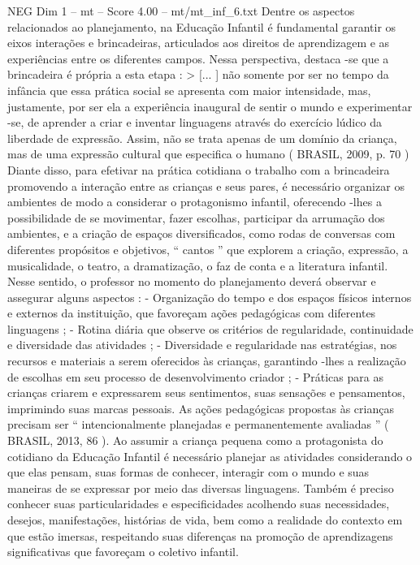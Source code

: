 \begin{textsample}{NEG Dim 1 – mt – Score 4.00 – mt/mt\_inf\_6.txt}
Dentre os aspectos relacionados ao planejamento, na Educação Infantil é fundamental garantir os eixos interações e brincadeiras, articulados aos direitos de aprendizagem e as experiências entre os diferentes campos.
Nessa perspectiva, destaca -se que a brincadeira é própria a esta etapa : > [... ] não somente por ser no tempo da infância que essa prática social se apresenta com maior intensidade, mas, justamente, por ser ela a experiência inaugural de sentir o mundo e experimentar -se, de aprender a criar e inventar linguagens através do exercício lúdico da liberdade de expressão.
Assim, não se trata apenas de um domínio da criança, mas de uma expressão cultural que especifica o humano ( BRASIL, 2009, p. 70 ) Diante disso, para efetivar na prática cotidiana o trabalho com a brincadeira promovendo a interação entre as crianças e seus pares, é necessário organizar os ambientes de modo a considerar o protagonismo infantil, oferecendo -lhes a possibilidade de se movimentar, fazer escolhas, participar da arrumação dos ambientes, e a criação de espaços diversificados, como rodas de conversas com diferentes propósitos e objetivos, “ cantos ” que explorem a criação, expressão, a musicalidade, o teatro, a dramatização, o faz de conta e a literatura infantil.
Nesse sentido, o professor no momento do planejamento deverá observar e assegurar alguns aspectos : - Organização do tempo e dos espaços físicos internos e externos da instituição, que favoreçam ações pedagógicas com diferentes linguagens ; - Rotina diária que observe os critérios de regularidade, continuidade e diversidade das atividades ; - Diversidade e regularidade nas estratégias, nos recursos e materiais a serem oferecidos às crianças, garantindo -lhes a realização de escolhas em seu processo de desenvolvimento criador ; - Práticas para as crianças criarem e expressarem seus sentimentos, suas sensações e pensamentos, imprimindo suas marcas pessoais.
As ações pedagógicas propostas às crianças precisam ser “ intencionalmente planejadas e permanentemente avaliadas ” ( BRASIL, 2013, 86 ).
Ao assumir a criança pequena como a protagonista do cotidiano da Educação Infantil é necessário planejar as atividades considerando o que elas pensam, suas formas de conhecer, interagir com o mundo e suas maneiras de se expressar por meio das diversas linguagens.
Também é preciso conhecer suas particularidades e especificidades acolhendo suas necessidades, desejos, manifestações, histórias de vida, bem como a realidade do contexto em que estão imersas, respeitando suas diferenças na promoção de aprendizagens significativas que favoreçam o coletivo infantil.

\end{textsample}
